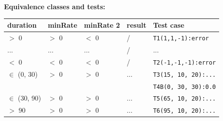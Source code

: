 \documentclass[12pt]{article}
\begin{document}
\textbf{Equivalence classes and tests:}
\begin{center}
  \begin{tabular}{|l|l|l|l|l|}
    \hline
    duration & minRate & minRate 2 &result & Test case \\
    \hline
    $>$ 0 & $>$ 0 & $<$ 0 & / & \texttt{T1(1,1,-1):error} \\
    \hline
    ... & ... & ... & / & ... \\
    \hline
    $<$ 0 & $<$ 0 & $<$ 0 & / & \texttt{T2(-1,-1,-1):error} \\
    \hline
    $\in$ (0, 30) & $>$ 0 & $>$ 0 & ... & \texttt{T3(15, 10, 20):...} \\
    & & & & \texttt{T4B(0, 30, 30):0.0} \\
    \hline
    $\in$ (30, 90) & $>$ 0 & $>$ 0 & ... & \texttt{T5(65, 10, 20):...} \\
    \hline
    $>$ 90 & $>$ 0 & $>$ 0 & ... & \texttt{T6(95, 10, 20):...} \\
    \hline
  \end{tabular}
\end{center}
\end{document}
